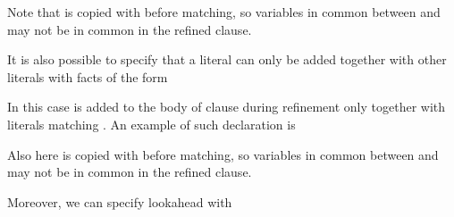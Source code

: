 \documentclass[letterpaper,10pt,english]{sphinxmanual}
\begin{document}
\sphinxAtStartPar
Note that  is copied with  before matching, so variables in common between  and  may not be in common in the refined clause.

\sphinxAtStartPar
It is also possible to specify that a literal can only be added together with other literals with facts of the form

\begin{sphinxVerbatim}[commandchars=\\\{\}]
  
\end{sphinxVerbatim}

\sphinxAtStartPar
In this case  is added to the body of clause during refinement only together with literals matching .
An example of such declaration is

\begin{sphinxVerbatim}[commandchars=\\\{\}]
\PYG{p}{[}\PYG{p}{]}
\end{sphinxVerbatim}

\sphinxAtStartPar
Also here  is copied with  before matching, so variables in common between  and  may not be in common in the refined clause.

\sphinxAtStartPar
Moreover, we can specify lookahead with

\begin{sphinxVerbatim}[commandchars=\\\{\}]
  
\end{sphinxVerbatim}
\end{document}
